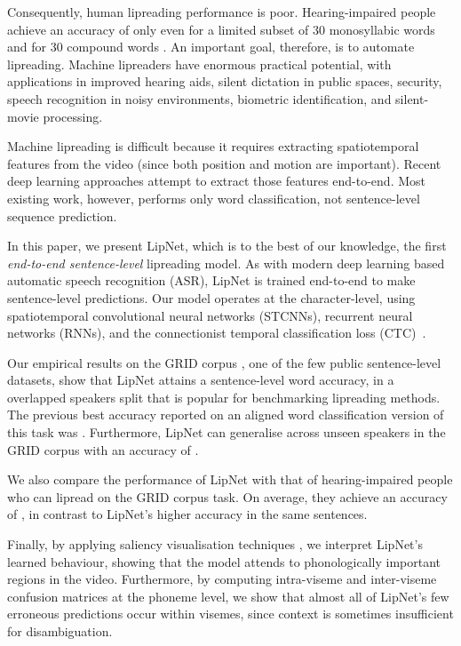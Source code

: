 \documentclass{article}
\begin{document}
Consequently, human lipreading performance is poor.  Hearing-impaired people achieve an accuracy of only  even for a limited subset of 30 monosyllabic words and  for 30 compound words \citep{easton1982perceptual}. 
An important goal, therefore, is to automate lipreading. Machine lipreaders have enormous practical potential, with applications in improved hearing aids, silent dictation in public spaces, security, speech recognition in noisy environments, biometric identification, and silent-movie processing.



Machine lipreading is difficult because it requires extracting spatiotemporal features from the video (since both position and motion are important). Recent deep learning approaches attempt to extract those features end-to-end. Most existing work, however, performs only word classification, not sentence-level sequence prediction.



In this paper, we present LipNet, which is to the best of our knowledge, the first \emph{end-to-end sentence-level} lipreading model.
As with modern deep learning based automatic speech recognition (ASR), LipNet is trained end-to-end to make sentence-level predictions. 
Our model operates at the character-level, using spatiotemporal convolutional neural networks (STCNNs), recurrent neural networks (RNNs), and the connectionist temporal classification loss (CTC)~\cite{graves2006connectionist}. 

Our empirical results on the GRID corpus \citep{cooke2006audio}, one of the few public sentence-level datasets, show that  LipNet attains a  sentence-level word accuracy, in a overlapped speakers split that is popular for benchmarking lipreading methods. The previous best accuracy reported on an aligned word classification version of this task was   \citep{gergen2016dynamic}. Furthermore, LipNet can generalise across unseen speakers in the GRID corpus with an accuracy of .


We also compare the performance of LipNet with that of hearing-impaired people who can lipread on the GRID corpus task. On average, they achieve an accuracy of , in contrast to LipNet's  higher accuracy in the same sentences.

Finally, by applying saliency visualisation techniques \citep{zeiler2014visualizing,simonyan2013deep}, we interpret LipNet's learned behaviour, showing that the model attends to phonologically important regions in the video.
Furthermore, by computing intra-viseme and inter-viseme confusion matrices at the phoneme level, we show that almost all of LipNet's few erroneous predictions occur within visemes, since context is sometimes insufficient for disambiguation.
\end{document}
